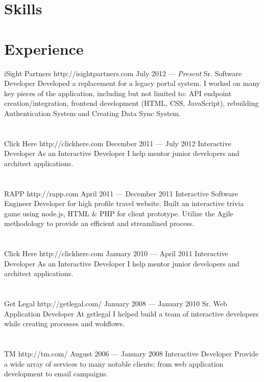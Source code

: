\documentclass{resume}
\begin{document}

\smallskip

\section{Skills}


\section{Experience}

\employer
	{iSight Partners}
	{http://isightpartners.com}
	{July 2012 --- \emph{Present}}
	{Sr. Software Developer}
	{Developed a replacement for a legacy portal system. I worked on many key pieces of the application, including but not limited to: API endpoint creation/integration, frontend development (HTML, CSS, JavaScript), rebuilding Authentication System and Creating Data Sync System.}
\\ \\ \\
\employer
	{Click Here}
	{http://clickhere.com}
	{December 2011 --- July 2012}
	{Interactive Developer}
	{As an Interactive Developer I help mentor junior developers and architect applications.}
\\ \\ \\
\employer
	{RAPP}
	{http://rapp.com}
	{April 2011 --- December 2011}
	{Interactive Software Engineer}
	{Developer for high profile travel website. Built an interactive trivia game using node.js, HTML \& PHP for client prototype. Utilize the Agile methodology to provide an efficient and streamlined process.}
\\ \\ \\
\employer
	{Click Here}
	{http://clickhere.com}
	{January 2010 --- April 2011}
	{Interactive Developer}
	{As an Interactive Developer I help mentor junior developers and architect applications.}
\\ \\ \\
\employer
	{Get Legal}
	{http://getlegal.com/}
	{January 2008 --- January 2010}
	{Sr. Web Application Developer}
	{At getlegal I helped build a team of interactive developers while creating processes and wokflows.}
\\ \\ \\
\employer
	{TM}
	{http://tm.com/}
	{August 2006 --- January 2008}
	{Interactive Developer}
	{Provide a wide array of services to many notable clients; from web application development to email campaigns.}
\end{document}
